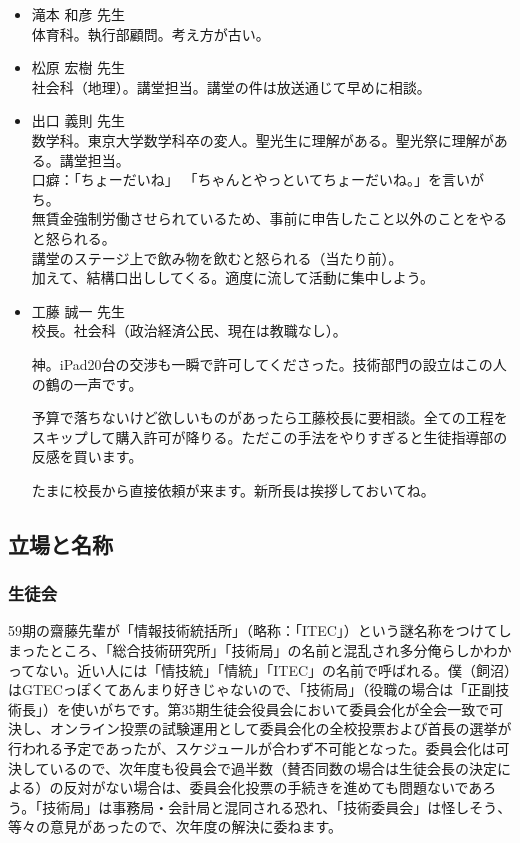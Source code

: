 \documentclass[dvipdfmx,jb5]{jarticle}
\begin{document}
\begin{itemize}
  \item 滝本 和彦 先生\\
  体育科。執行部顧問。考え方が古い。

  \item 松原 宏樹 先生\\
  社会科（地理）。講堂担当。講堂の件は放送通じて早めに相談。

  \item 出口 義則 先生\\
  数学科。東京大学数学科卒の変人。聖光生に理解がある。聖光祭に理解がある。講堂担当。
  \\口癖：「ちょーだいね」
  「ちゃんとやっといてちょーだいね。」を言いがち。\\
  無賃金強制労働させられているため、事前に申告したこと以外のことをやると怒られる。\\
  講堂のステージ上で飲み物を飲むと怒られる（当たり前）。\\
  加えて、結構口出ししてくる。適度に流して活動に集中しよう。

  \item 工藤 誠一 先生\\
  校長。社会科（政治経済公民、現在は教職なし）。

  神。iPad20台の交渉も一瞬で許可してくださった。技術部門の設立はこの人の鶴の一声です。

  予算で落ちないけど欲しいものがあったら工藤校長に要相談。全ての工程をスキップして購入許可が降りる。ただこの手法をやりすぎると生徒指導部の反感を買います。

  たまに校長から直接依頼が来ます。新所長は挨拶しておいてね。
\end{itemize}

\subsection{立場と名称}
\subsubsection{生徒会}
59期の齋藤先輩が「情報技術統括所」（略称：「ITEC」）という謎名称をつけてしまったところ、「総合技術研究所」「技術局」の名前と混乱され多分俺らしかわかってない。近い人には「情技統」「情統」「ITEC」の名前で呼ばれる。僕（飼沼）はGTECっぽくてあんまり好きじゃないので、「技術局」（役職の場合は「正副技術長」）を使いがちです。第35期生徒会役員会において委員会化が全会一致で可決し、オンライン投票の試験運用として委員会化の全校投票および首長の選挙が行われる予定であったが、スケジュールが合わず不可能となった。委員会化は可決しているので、次年度も役員会で過半数（賛否同数の場合は生徒会長の決定による）の反対がない場合は、委員会化投票の手続きを進めても問題ないであろう。「技術局」は事務局・会計局と混同される恐れ、「技術委員会」は怪しそう、等々の意見があったので、次年度の解決に委ねます。
\end{document}
